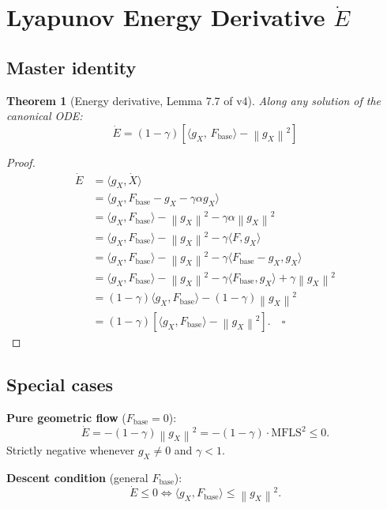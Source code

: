 \documentclass[11pt,a4paper]{article}
\newtheorem{theorem}{Theorem}[section]
\theoremstyle{definition}
\newcommand{\norm}[1]{\left\|#1\right\|}
\newcommand{\inner}[2]{\langle #1,\,#2\rangle}
\newcommand{\Fbase}{F_{\mathrm{base}}}
\newcommand{\gX}{g_X}
\newcommand{\mfls}{\mathrm{MFLS}}
\begin{document}
\section{Lyapunov Energy Derivative $\dot E$}

\subsection{Master identity}

\begin{theorem}[Energy derivative, Lemma 7.7 of v4]
Along any solution of the canonical ODE:
\[
\dot E = (1-\gamma)\left[\inner{\gX}{\Fbase} - \norm{\gX}^2\right]
\]
\end{theorem}

\begin{proof}
\begin{align*}
\dot E &= \langle\gX, \dot X\rangle \\
&= \langle\gX, \Fbase - \gX - \gamma\alpha\gX\rangle \\
&= \langle\gX,\Fbase\rangle - \norm{\gX}^2 - \gamma\alpha\norm{\gX}^2 \\
&= \langle\gX,\Fbase\rangle - \norm{\gX}^2 - \gamma\langle F,\gX\rangle \\
&= \langle\gX,\Fbase\rangle - \norm{\gX}^2 - \gamma\langle\Fbase-\gX,\gX\rangle \\
&= \langle\gX,\Fbase\rangle - \norm{\gX}^2 - \gamma\langle\Fbase,\gX\rangle + \gamma\norm{\gX}^2 \\
&= (1-\gamma)\langle\gX,\Fbase\rangle - (1-\gamma)\norm{\gX}^2 \\
&= (1-\gamma)\left[\langle\gX,\Fbase\rangle - \norm{\gX}^2\right]. \quad\square
\end{align*}
\end{proof}

\subsection{Special cases}

\textbf{Pure geometric flow} ($\Fbase = 0$):
\[
\dot E = -(1-\gamma)\norm{\gX}^2 = -(1-\gamma)\cdot\mfls^2 \leq 0.
\]
Strictly negative whenever $\gX \neq 0$ and $\gamma < 1$.

\textbf{Descent condition} (general $\Fbase$):
\[
\dot E \leq 0 \iff \langle\gX,\Fbase\rangle \leq \norm{\gX}^2.
\]
\end{document}
